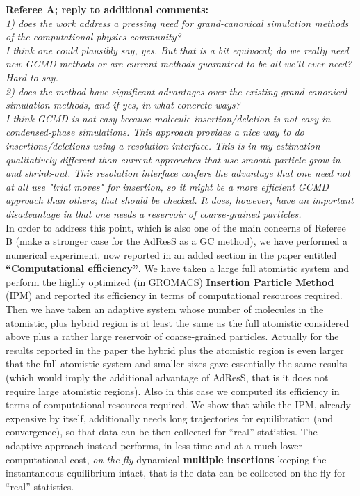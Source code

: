 \documentclass[12pt,a4paper]{article}
\begin{document}
{\bf Referee A; reply to  additional comments:}\\
{\color{teal} {\it 1) does the work address a pressing need for grand-canonical
simulation methods of the computational physics community?\\

I think one could plausibly say, yes. But that is a bit equivocal;
do we really need new GCMD methods or are current methods guaranteed
to be all we'll ever need? Hard to say.\\
2) does the method have significant advantages over the existing
grand canonical simulation methods, and if yes, in what concrete
ways?\\
I think GCMD is not easy because molecule insertion/deletion is not
easy in condensed-phase simulations. This approach provides a nice way
to do insertions/deletions using a resolution interface. This is in
my estimation qualitatively different than current approaches that use
smooth particle grow-in and shrink-out. This resolution interface
confers the advantage that one need not at all use "trial moves" for
insertion, so it might be a more efficient GCMD approach than others;
that should be checked. It does, however, have an important
disadvantage in that one needs a reservoir of coarse-grained
particles.}}\\
In order to address this point, which is also one of the main concerns of Referee B (make a stronger case for the AdResS as a GC method),
we have performed a numerical experiment, now reported in an added section in the paper entitled {\bf ``Computational efficiency''}.
We have taken a large full atomistic system and perform the highly optimized (in GROMACS) {\bf Insertion Particle Method} (IPM)  and reported its efficiency in terms of computational resources required.
Then we have taken an adaptive system whose number of molecules in the atomistic, plus hybrid region is at least the same as the full atomistic considered above  plus a rather large reservoir of coarse-grained particles. Actually for the results reported in the paper the hybrid plus the atomistic region is even larger that the full atomistic system and smaller sizes gave essentially the same results (which would imply the additional advantage of AdResS, that is it does not require large atomistic regions).
Also in this case we computed its efficiency in terms of computational resources required.
We show that while the IPM, already expensive by itself, additionally needs long trajectories for equilibration (and convergence), so that data can be then collected for ``real'' statistics. The adaptive approach instead performs, in less time and at a much lower computational cost, {\it on-the-fly} dynamical {\bf multiple insertions} keeping the instantaneous equilibrium intact, that is the data can be collected on-the-fly for ``real'' statistics.\\
\end{document}
